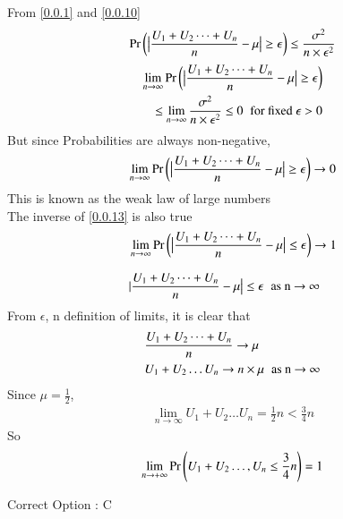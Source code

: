 \documentclass[journal,12pt,twocolumn]{IEEEtran}
\begin{document}
From \eqref{0.0.1} and \eqref{0.0.10}
\begin{align}
    \Pr\left(\big|\frac{U_1+U_2\dots+U_n}{n} - \mu\big| \geq \epsilon\right) \leq \frac{\sigma^2}{n\times\epsilon^2}\notag
\end{align}
\begin{align}
    \begin{split}
    \lim_{n \to \infty} \Pr\left(\big|\frac{U_1+U_2\dots+U_n}{n} - \mu\big| \geq \epsilon\right)\\
    \leq \lim_{n \to \infty} \frac{\sigma^2}{n\times\epsilon^2} \leq 0 \hspace{0.2cm} \text{for fixed $\epsilon > 0$}
    \end{split}
\end{align}
But since Probabilities are always non-negative,
\begin{align}
    \lim_{n \to \infty} \Pr\left(\big|\frac{U_1+U_2\dots+U_n}{n} - \mu\big| \geq \epsilon\right) \to 0 \label{0.0.13}
\end{align}
This is known as the weak law of large numbers\\
The inverse of \eqref{0.0.13} is also true
\begin{align}
    &\lim_{n \to \infty} \Pr\left(\big|\frac{U_1+U_2\dots+U_n}{n} - \mu\big| \leq \epsilon\right) \to 1 \\[0.3cm]
    &|\frac{U_1+U_2\dots+U_n}{n} - \mu\big| \leq \epsilon \hspace{0.2cm}\text{as  n $\to$ $\infty$} 
\end{align}
From $\epsilon$, n definition of limits, it is clear that 
\begin{align}
    &\frac{U_1+U_2\dots+U_n}{n} \to \mu\\
    &U_1+U_2\dots U_n \to n\times\mu \hspace{0.2cm}\text{as  n $\to$ $\infty$}
\end{align}
Since $\mu = \frac{1}{2}$,
\begin{align}
    \lim_{n \to \infty} U_1+U_2\dots U_n = \frac{1}{2}n < \frac{3}{4}n
\end{align}
So 
\begin{align}
    \lim_{n \to +\infty} \Pr\left(U_1+U_2\dots,U_n\leq \frac{3}{4}n\right) = 1
\end{align}
\begin{center}
    Correct Option : C
\end{center}
\end{document}
